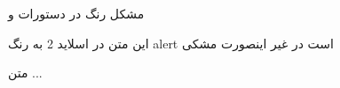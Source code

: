 \documentclass{beamer}
\begin{document}
\begin{frame}
مشکل رنگ در دستورات
و

\alert<2>{این متن در اسلاید 2 به رنگ alert است در غیر اینصورت مشکی}

متن ...

\end{frame}
\end{document}

